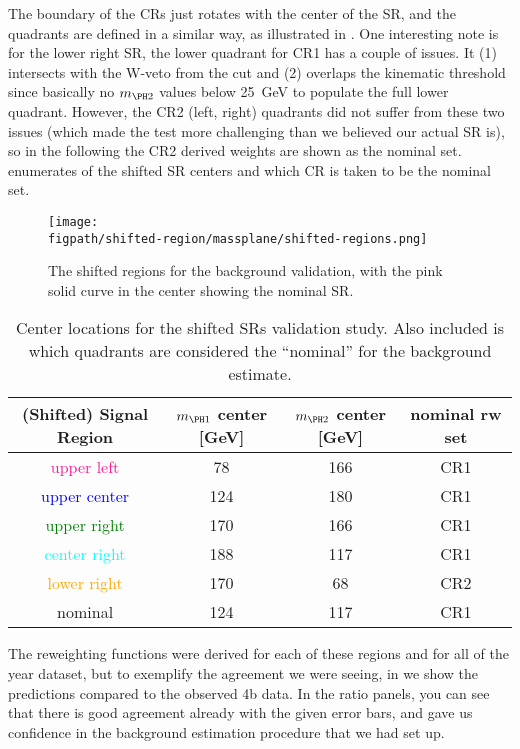 The boundary of the CRs just rotates with the center of the SR, and the quadrants are defined in a similar way, as illustrated in \Fig{\ref{Xhh-newRegions}}.
One interesting note is for the lower right SR, the lower quadrant for CR1 has a couple of issues. It (1) intersects with the W-veto from the \Xwt cut and (2) overlaps the kinematic threshold since basically no $m_{\PH 2}$ values below 25~GeV to populate the full lower quadrant.
However, the CR2 (left, right) quadrants did not suffer from these two issues (which made the test more challenging than we believed our actual SR is), so in the following the CR2 derived weights are shown as the nominal set. 
\Tab{\ref{tab:shift-sr-centers}} enumerates of the shifted SR centers and which CR is taken to be the nominal set. 

\begin{figure}[ht]
  \centering
  \texttt{[image: \\figpath/shifted-region/massplane/shifted-regions.png]}%
  \caption{The shifted regions for the background validation, with the pink solid curve in the center showing the nominal SR. }
           \label{fig:shifted-regions}
\end{figure}

\begin{table}[htbp]
\centering
\begin{tabular}{ c | c | c | c}
\textbf{(Shifted) Signal Region} & $m_{\PH1}$ center [GeV] &  $m_{\PH2} $ center [GeV] & nominal rw set \\
\hline
\textcolor{deeppink}{upper left} & 78 & 166 & CR1 \\
\textcolor{blue}{upper center} & 124 & 180 & CR1 \\
\textcolor{green}{upper right} & 170 & 166 & CR1 \\
\textcolor{cyan}{center right} & 188 & 117 & CR1 \\
\textcolor{orange}{lower right} & 170 & 68 & CR2 \\
\hline
\textcolor{hh:darkpink}{nominal} & 124 & 117 & CR1 \\
\end{tabular}
\caption{Center locations for the shifted SRs validation study. Also included is which quadrants are considered the ``nominal''  for the background estimate.}
\label{tab:shift-sr-centers}
\end{table}

\def\yr{18}
The reweighting functions were derived for each of these regions and for all of the year dataset, but to exemplify the agreement we were seeing, in \Fig{\ref{fig:bkgd4b-20\yr-shifted-region}} we show the \mhh predictions compared to the observed 4b data. 
In the ratio panels, you can see that there is good agreement already with the given error bars, and gave us confidence in the background estimation procedure that we had set up.

